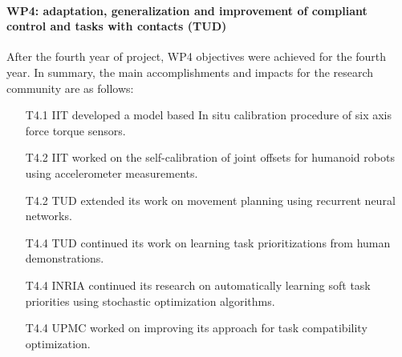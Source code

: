 

\paragraph*{WP4: adaptation, generalization and improvement of compliant control and tasks with contacts (TUD)}

After the fourth year of project, WP4 objectives were achieved for the fourth year. In summary, the main accomplishments and impacts for the research community are as follows: 

\begin{itemize}

\item[T4.1] IIT developed a model based In situ calibration procedure of six axis force torque sensors.

\item[T4.2] IIT worked on the self-calibration of joint offsets for humanoid robots using accelerometer measurements.

\item[T4.2] TUD extended its work on movement planning using recurrent neural networks.

\item[T4.4] TUD continued its work on learning task prioritizations from human demonstrations.

\item[T4.4] INRIA continued its research on automatically learning soft task priorities using stochastic optimization algorithms. 

\item[T4.4] UPMC worked on improving its approach for task compatibility optimization.

 \end{itemize}
